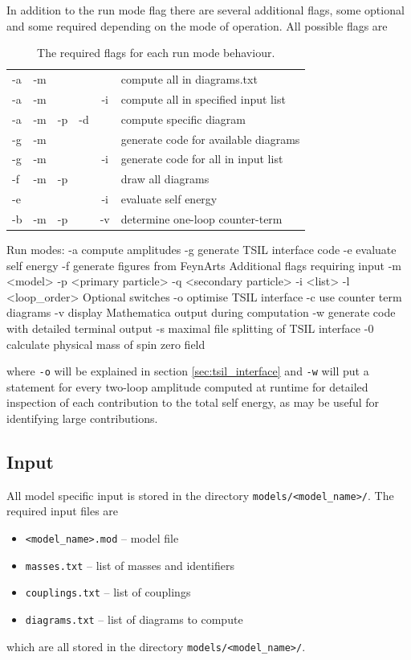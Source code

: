 In addition to the run mode flag there are several additional flags, some optional and some required depending on the mode of operation.  All possible flags are
\begin{table}
\caption{The required flags for each run mode behaviour.}
\begin{tabular}{l c c c c l} 
\hline
-a & -m & & & &compute all in diagrams.txt \\
-a & -m &  && -i&compute all in specified input list\\
-a & -m & -p & -d && compute specific diagram\\
-g & -m & & &  &generate code for available diagrams\\
-g & -m &  & & -i &generate code for all in input list\\
-f & -m & -p & & &draw all diagrams\\
-e &  & & & -i&evaluate self energy\\
-b & -m & -p & & -v&determine one-loop counter-term\\
\hline\end{tabular}
\end{table}
\begin{lstterm}
Run modes:
-a 		compute amplitudes
-g		generate TSIL interface code
-e		evaluate self energy
-f		generate figures from FeynArts
Additional flags requiring input
-m <model> 
-p <primary particle>
-q <secondary particle>
-i  <list>
-l <loop_order>
Optional switches
-o		optimise TSIL interface
-c		use counter term diagrams
-v		display Mathematica output during computation
-w		generate code with detailed terminal output
-s		maximal file splitting of TSIL interface
-0		calculate physical mass of spin zero field
\end{lstterm}
where \lstinline{-o} will be explained in section \ref{sec:tsil_interface} and \lstinline{-w} will put a  statement for every two-loop amplitude computed at runtime for detailed inspection of each contribution to the total self energy, as may be useful for identifying large contributions.


\subsection{Input}

All model specific input is stored in the directory \lstinline{models/<model_name>/}.  The required input files are
\begin{itemize}
\item \lstinline{<model_name>.mod}  -- \feynarts model file
\item \lstinline{masses.txt} -- list of masses and identifiers
\item \lstinline{couplings.txt} -- list of couplings
\item \lstinline{diagrams.txt} -- list of diagrams to compute
\end{itemize}
which are all stored in the directory \lstinline{models/<model_name>/}.


